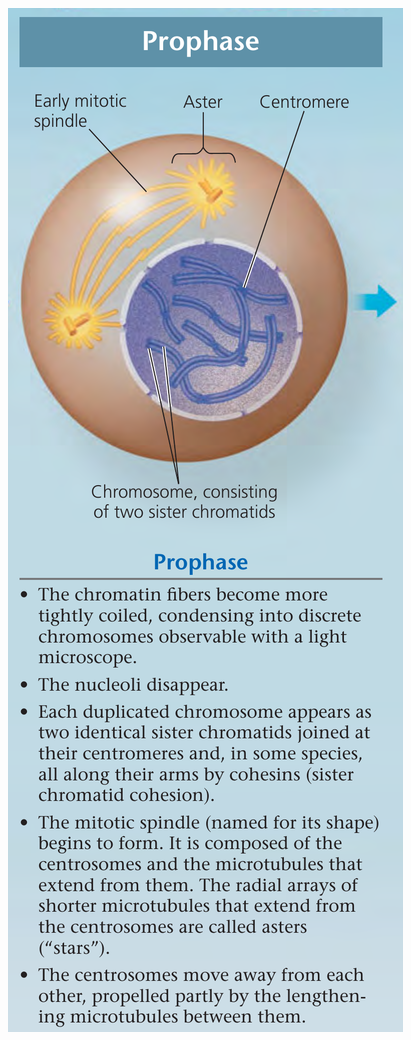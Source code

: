 \documentclass[11pt,ignorenonframetext,aspectratio=169]{beamer}
\begin{document}
\begin{frame}{}
\begin{columns}[T,onlytextwidth]
\begin{center}\includegraphics[width=0.6\linewidth]{../images/mitosis_animal_cell22} \end{center}
  



\end{columns}
\end{frame}
\end{document}

